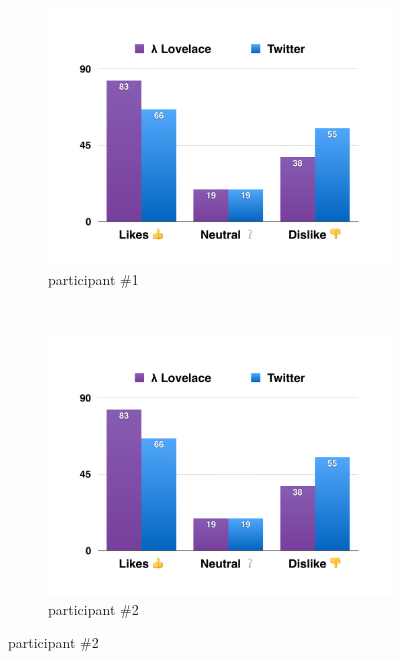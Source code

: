 \documentclass{article}
\begin{document}
\begin{figure}
    \centering
    \begin{subfigure}[b]{0.48\textwidth}
        \includegraphics[page=1,width=\textwidth]{evaluation_charts}
        \caption{participant \#1}
        \label{fig:participant1}
    \end{subfigure}
    ~ 
      
    \begin{subfigure}[b]{0.48\textwidth}
        \includegraphics[page=2,width=\textwidth]{evaluation_charts}
        \caption{participant \#2}
        \label{fig:participant2}
    \end{subfigure}
    
    \vspace{2em}
    

\end{figure}
\end{document}
